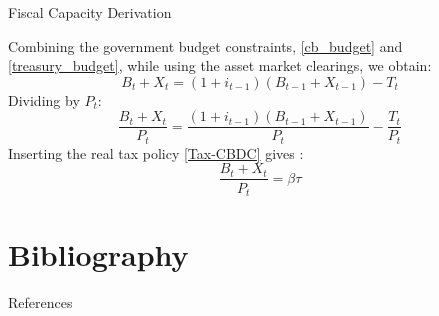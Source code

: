 \documentclass[11pt,aspectratio=169]{beamer}
\begin{document}
\begin{frame}
[label=fiscal_cap]{Fiscal Capacity Derivation}

Combining the government budget constraints, \eqref{cb_budget} and \eqref{treasury_budget}, while using the asset market clearings, we obtain: 
\begin{equation}
    B_t+X_t =(1+i_{t-1})(B_{t-1}+X_{t-1}) -T_t
\end{equation}
Dividing by $P_t$:
\begin{equation}
    \frac{B_t+X_t}{P_t} =\frac{(1+i_{t-1})(B_{t-1}+X_{t-1})}{P_t} -\frac{T_t}{P_t}\end{equation}
Inserting the real tax policy \eqref{Tax-CBDC} gives :
\begin{equation}
    \frac{B_t+X_t}{P_t} =\beta\tau
\end{equation}
\begin{center}
\hyperlink{fiscal_capacity}{}
\end{center}
\end{frame}

\section{Bibliography}

\begin{frame}{References}
\printbibliography
\end{frame}
\end{document}
